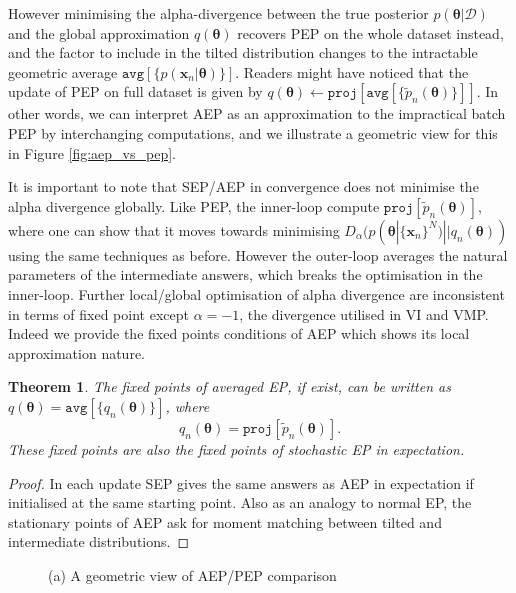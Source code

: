 \documentclass{article} %
\newtheorem{theorem}{Theorem}
\begin{document}
However minimising the alpha-divergence between the true posterior $p(\bm{\theta}|\mathcal{D})$ and the global approximation $q(\bm{\theta})$ recovers PEP on the whole dataset instead, and the factor to include in the tilted distribution changes to the intractable geometric average $\mathtt{avg}[\{p(\bm{x}_n | \bm{\theta}) \}]$. Readers might have noticed that the update of PEP on full dataset is given by $q(\bm{\theta}) \leftarrow \mathtt{proj}[\mathtt{avg}[\{ \tilde{p}_n(\bm{\theta}) \}]]$. In other words, we can interpret AEP as an approximation to the impractical batch PEP by interchanging computations, and we illustrate a geometric view for this in Figure \ref{fig:aep_vs_pep}.

It is important to note that SEP/AEP in convergence does not minimise the alpha divergence globally. Like PEP, the inner-loop compute $\mathtt{proj}[\tilde{p}_n(\bm{\theta})]$, where one can show that it moves towards minimising $D_{\alpha}(p(\bm{\theta} | \{\bm{x}_n\}^N) || q_n(\bm{\theta}))$ using the same techniques as before. However the outer-loop averages the natural parameters of the intermediate answers, which breaks the optimisation in the inner-loop. Further local/global optimisation of alpha divergence are inconsistent in terms of fixed point except $\alpha = -1$, the divergence utilised in VI and VMP. Indeed we provide the fixed points conditions of AEP which shows its local approximation nature.
%
\begin{theorem}
The fixed points of averaged EP, if exist, can be written as $q(\bm{\theta}) = \mathtt{avg}[\{q_n(\bm{\theta})\}]$, where
\begin{equation}
q_n(\bm{\theta}) = \mathtt{proj}[\tilde{p}_n(\bm{\theta})].
\label{eq:mm}
\end{equation}
These fixed points are also the fixed points of stochastic EP in expectation. 
\end{theorem}
\begin{proof}
In each update SEP gives the same answers as AEP in expectation if initialised at the same starting point. Also as an analogy to normal EP, the stationary points of AEP ask for moment matching between tilted and intermediate distributions. 
\end{proof}
%

\begin{figure}
\centering
\def\svgwidth{0.35\linewidth}
\subfigure[\label{fig:aep_vs_pep}]{
}
%
\caption{(a) A geometric view of AEP/PEP comparison}
\end{figure}
\end{document}

